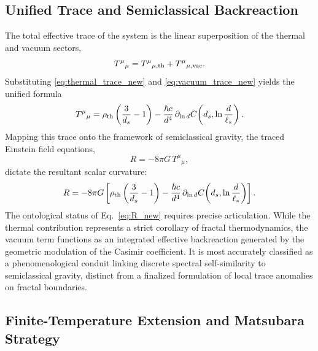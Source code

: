 \documentclass[12pt,letterpaper]{article}
\begin{document}
\subsection{Unified Trace and Semiclassical Backreaction}

The total effective trace of the system is the linear superposition of the thermal and vacuum sectors,
\begin{equation}
T^\mu{}_{\mu} = T^\mu{}_{\mu,\rm th}+T^\mu{}_{\mu,\rm vac}.
\label{eq:total_trace_new}
\end{equation}
Substituting \eqref{eq:thermal_trace_new} and \eqref{eq:vacuum_trace_new} yields the unified formula
\begin{equation}
T^\mu{}_{\mu} = \rho_{\rm th}\left(\frac{3}{d_s}-1\right) - \frac{\hbar c}{d^4} \,\partial_{\ln d}C\!\left(d_s,\ln\frac{d}{\ell_*}\right).
\label{eq:total_trace_explicit_new}
\end{equation}
Mapping this trace onto the framework of semiclassical gravity, the traced Einstein field equations,
\begin{equation}
R=-8\pi G\,T^\mu{}_{\mu},
\label{eq:trace_einstein_new}
\end{equation}
dictate the resultant scalar curvature:
\begin{equation}
R = -8\pi G \left[ \rho_{\rm th}\left(\frac{3}{d_s}-1\right) - \frac{\hbar c}{d^4} \,\partial_{\ln d}C\!\left(d_s,\ln\frac{d}{\ell_*}\right) \right].
\label{eq:R_new}
\end{equation}
The ontological status of Eq.~\eqref{eq:R_new} requires precise articulation. While the thermal contribution represents a strict corollary of fractal thermodynamics, the vacuum term functions as an integrated effective backreaction generated by the geometric modulation of the Casimir coefficient.
It is most accurately classified as a phenomenological conduit linking discrete spectral self-similarity to semiclassical gravity, distinct from a finalized formulation of local trace anomalies on fractal boundaries.

\subsection{Finite-Temperature Extension and Matsubara Strategy}
\end{document}

